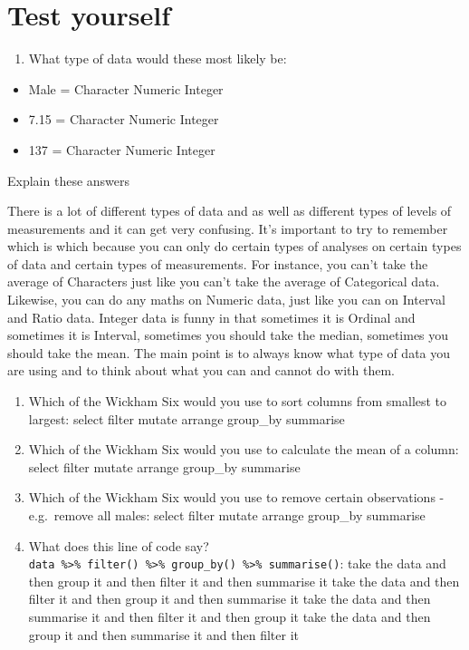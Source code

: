 \documentclass[]{book}
\providecommand{\tightlist}{%
  \setlength{\itemsep}{0pt}\setlength{\parskip}{0pt}}
\begin{document}
\hypertarget{test-yourself-2}{%
\section{Test yourself}\label{test-yourself-2}}

\begin{enumerate}
\def\labelenumi{\arabic{enumi}.}
\tightlist
\item
  What type of data would these most likely be:
\end{enumerate}

\begin{itemize}
\item
  Male = Character Numeric Integer
\item
  7.15 = Character Numeric Integer
\item
  137 = Character Numeric Integer
\end{itemize}

Explain these answers

There is a lot of different types of data and as well as different types of levels of measurements and it can get very confusing. It's important to try to remember which is which because you can only do certain types of analyses on certain types of data and certain types of measurements. For instance, you can't take the average of Characters just like you can't take the average of Categorical data. Likewise, you can do any maths on Numeric data, just like you can on Interval and Ratio data. Integer data is funny in that sometimes it is Ordinal and sometimes it is Interval, sometimes you should take the median, sometimes you should take the mean. The main point is to always know what type of data you are using and to think about what you can and cannot do with them.

\begin{enumerate}
\def\labelenumi{\arabic{enumi}.}
\setcounter{enumi}{1}
\item
  Which of the Wickham Six would you use to sort columns from smallest to largest: select filter mutate arrange group\_by summarise
\item
  Which of the Wickham Six would you use to calculate the mean of a column: select filter mutate arrange group\_by summarise
\item
  Which of the Wickham Six would you use to remove certain observations - e.g.~remove all males: select filter mutate arrange group\_by summarise
\item
  What does this line of code say? \texttt{data\ \%\textgreater{}\%\ filter()\ \%\textgreater{}\%\ group\_by()\ \%\textgreater{}\%\ summarise()}: take the data and then group it and then filter it and then summarise it take the data and then filter it and then group it and then summarise it take the data and then summarise it and then filter it and then group it take the data and then group it and then summarise it and then filter it
\end{enumerate}
\end{document}
